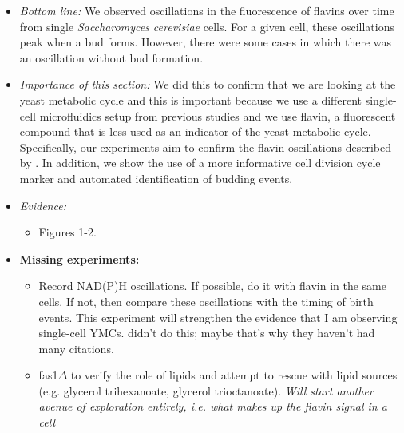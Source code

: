 \begin{itemize}
\item \emph{Bottom line:} We observed oscillations in the fluorescence of flavins over time from single \emph{Saccharomyces cerevisiae} cells.  For a given cell, these oscillations peak when a bud forms.  However, there were some cases in which there was an oscillation without bud formation.
\item \emph{Importance of this section:} We did this to confirm that we are looking at the yeast metabolic cycle and this is important because we use a different single-cell microfluidics setup from previous studies and we use flavin, a fluorescent compound that is less used as an indicator of the yeast metabolic cycle.  Specifically, our experiments aim to confirm the flavin oscillations described by \cite{baumgartnerFlavinbasedMetabolicCycles2018}.  In addition, we show the use of a more informative cell division cycle marker and automated identification of budding events.
\item \emph{Evidence:}
\begin{itemize}
\item Figures 1-2.
\end{itemize}

\item \textbf{Missing experiments:}
\begin{itemize}
\item Record NAD(P)H oscillations.  If possible, do it with flavin in the same cells.  If not, then compare these oscillations with the timing of birth events.  This experiment will strengthen the evidence that I am observing single-cell YMCs.  \cite{baumgartnerFlavinbasedMetabolicCycles2018} didn't do this; maybe that's why they haven't had many citations.
\item fas1\(\Delta\) to verify the role of lipids and attempt to rescue with lipid sources (e.g. glycerol trihexanoate, glycerol trioctanoate). \emph{Will start another avenue of exploration entirely, i.e. what makes up the flavin signal in a cell}
\end{itemize}
\end{itemize}

